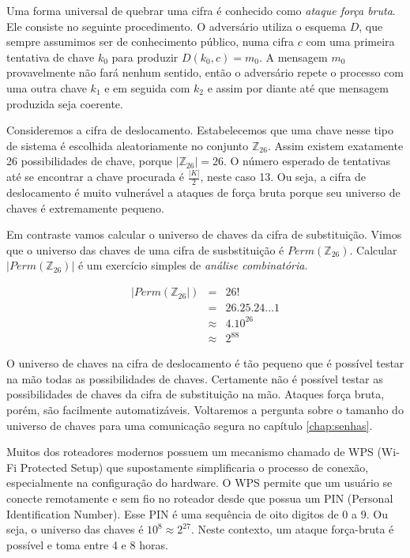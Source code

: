 Uma forma universal de quebrar uma cifra é conhecido como {\em ataque força bruta}.
Ele consiste no seguinte procedimento.
O adversário utiliza o esquema $D$, que sempre assumimos ser de conhecimento público, numa cifra $c$ com uma primeira tentativa de chave $k_0$ para produzir $D(k_0, c) = m_0$.
A mensagem $m_0$ provavelmente não fará nenhum sentido, então o adversário repete o processo com uma outra chave $k_1$ e em seguida com $k_2$ e assim por diante até que mensagem produzida seja coerente.

Consideremos a cifra de deslocamento.
Estabelecemos que uma chave nesse tipo de sistema é escolhida aleatoriamente no conjunto $\mathbb{Z}_{26}$.
Assim existem exatamente 26 possibilidades de chave, porque $|\mathbb{Z}_{26}| = 26$.
O número esperado de tentativas até se encontrar a chave procurada é $\frac{|K|}{2}$, neste caso 13.
Ou seja, a cifra de deslocamento é muito vulnerável a ataques de força bruta porque seu universo de chaves é extremamente pequeno.

Em contraste vamos calcular o universo de chaves da cifra de substituição.
Vimos que o universo das chaves de uma cifra de susbstituição é $Perm(\mathbb{Z}_{26})$.
Calcular $|Perm(\mathbb{Z}_{26})|$ é um exercício simples de {\em análise combinatória}.

\begin{eqnarray*}
  |Perm(\mathbb{Z}_{26}|) & = & 26!\\
                         & = & 26.25.24 \dots 1\\
                         & \approx & 4.10^{26}\\
                         & \approx & 2^{88}
\end{eqnarray*}

O universo de chaves na cifra de deslocamento é tão pequeno que é possível testar na mão todas as possibilidades de chaves.
Certamente não é possível testar as possibilidades de chaves da cifra de substituição na mão.
Ataques força bruta, porém, são facilmente automatizáveis.
Voltaremos a pergunta sobre o tamanho do universo de chaves para uma comunicação segura no capítulo \ref{chap:senhas}.


\begin{example}
Muitos dos roteadores modernos possuem um mecanismo chamado de WPS (Wi-Fi Protected Setup) que supostamente simplificaria o processo de conexão, especialmente na configuração do hardware.
O WPS permite que um usuário se conecte remotamente e sem fio no roteador desde que possua um PIN (Personal Identification Number).
Esse PIN é uma sequência de oito digitos de 0 a 9.
Ou seja, o universo das chaves é $10^8 \approx 2^{27}$.
Neste contexto, um ataque força-bruta é possível e toma entre 4 e 8 horas.
\end{example}


